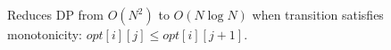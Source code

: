 
Reduces DP from $O(N^2)$ to $O(N \log N)$ when transition satisfies monotonicity: $opt[i][j] \le opt[i][j+1]$.


